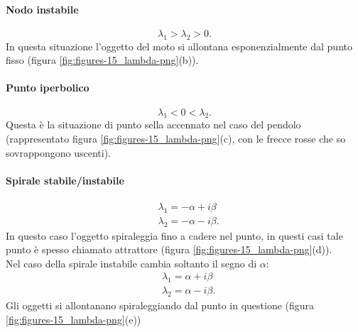 \paragraph{Nodo instabile}%
\label{par:Nodo instabile}
\[
    \lambda_1 > \lambda_2 > 0
.\] 
In questa situazione l'oggetto del moto si allontana esponenzialmente dal punto fisso (figura \ref{fig:figures-15_lambda-png}(b)).
\paragraph{Punto iperbolico}%
\label{par:Punto iperbolico}
\[
    \lambda_1<0<\lambda_2
.\] 
Questa è la situazione di punto sella accennato nel caso del pendolo (rappresentato figura \ref{fig:figures-15_lambda-png}(c), con le frecce rosse che so sovrappongono uscenti).
\paragraph{Spirale stabile/instabile}%
\label{par:Spirale stabile}
\[\begin{aligned}
    & \lambda_1 = -\alpha+i\beta\\
    & \lambda_2=-\alpha-i\beta
.\end{aligned}\]
In questo caso l'oggetto spiraleggia fino a cadere nel punto, in questi casi tale punto è spesso chiamato attrattore (figura \ref{fig:figures-15_lambda-png}(d)).\\
Nel caso della spirale instabile cambia soltanto il segno di $\alpha$:
\[\begin{aligned}
    & \lambda_1 = \alpha+i\beta\\
    & \lambda_2= \alpha-i\beta
.\end{aligned}\]
Gli oggetti si allontanano spiraleggiando dal punto in questione (figura \ref{fig:figures-15_lambda-png}(e))
